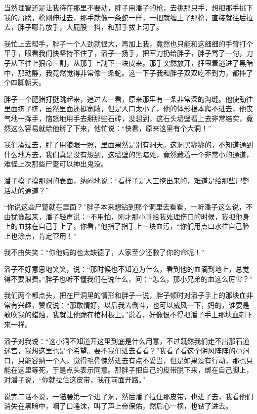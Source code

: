 当然理智还是让我待在那里不要动，胖子用潘子的枪，去挑那只手，想把那手挑下我的肩膀，枪刚伸过去，那手就像一条蛇一样，一把就缠上了那枪，直接就往后拉去，胖子哪肯放手，大屁股一抖，和那手拔上河了。

我忙上去帮手，胖子一个人劲就很大，再加上我，竟然也只能和这细细的手臂打个平手，眼看我们快坚持不住了，潘子一扬手，把军刀扔给胖子，胖子骂了一句，刀子从下往上狠命一割，从那手上刮下一块皮来。那手突然放开，狂甩着逃进了黑暗中，那动静，我竟然觉得非常像一条蛇。这一下子我和胖子双双吃不到力，都摔了个四脚朝天。

胖子一个肥猪打挺跳起来，追过去一看，原来那里有一条非常深的沟缝。他使劲往里面挤了挤，虽然里面还挺宽敞，但是入口太小了，他的体形根本爬不进去，他丧气地一挥手，恼怒地用手去掰那些石砖，没想到，这石头墙壁看上去非常结实，竟然这么容易就给他掰了下来，他忙说：“快看，原来这里有个大洞！”

我们凑过去，胖子用狼眼一照，里面果然是别有洞天。这洞黑糊糊的，不知道通到什么地方去，我们真是没有想到，这墙壁的黑暗处，竟然藏着一个非常小的通道，难怪上次那些尸蹩可以神出鬼没。

潘子摸了摸那洞的表面，纳闷地说：“看样子是人工挖出来的，难道是给那些尸蹩活动的通道？”

“你说这些尸蹩就在里面？”胖子本来想钻到那个洞里去看看，一听潘子这么说，不由犹豫起来，潘子轻声说：“不用怕，刚才那小哥给我处理伤口的时候，我把他身上的血抹在自己手上了，你看，”他指了指手上一块血污，“你们用点口水往自己脸上也涂点，肯定管用！”

我不由失笑：“你他妈的也太缺德了，人家至少还救了你的命呢！”

潘子不好意思地笑笑，说：“那时候也不知道为什么，看到他的血滴到地上，总觉得不要浪费。”胖子也听不懂我们在说什么，问：“怎么，那小兄弟的血这么厉害？”

我们两个都点头，把在尸洞里的情形和胖子一说，胖子顿时对潘子手上的那块血非常有兴趣，赞叹说：“那敢情好，以后我去倒斗，也可以威风一下，妈的，谁要是敢吹我的蜡烛，我就让他跪在棺材板上。”说着，好像恨不得把潘子手上那块血剜下来一样。

潘子对我说：“这小洞不知道开这里到底是什么用意，不过既然我们走不出那石道迷宫，我想这里也是个希望。要不我们进去看看？”我看了看这个阴风阵阵的小洞口，只能容纳一个人，觉得毛骨悚然进去有点不妥当，但是如果没有行动，那也只能在这里等死，于是点头表示同意。那胖子把自己的皮带脱下来，绑在自己脚上，对潘子说，“你就拉住这皮带，我在前面开路。”

说完二话不说，一猫腰第一个进了洞，然后潘子拉住那皮带，也进了去，我看他们消失在黑暗中，咽了口唾沫，叫了声上帝保佑，然后心一横，也钻了进去。

